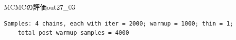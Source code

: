 \begin{Rscreen}{MCMCの評価}{out27_03}
	\begin{verbatim}
Samples: 4 chains, each with iter = 2000; warmup = 1000; thin = 1;
    total post-warmup samples = 4000
\end{verbatim}
\end{Rscreen}
